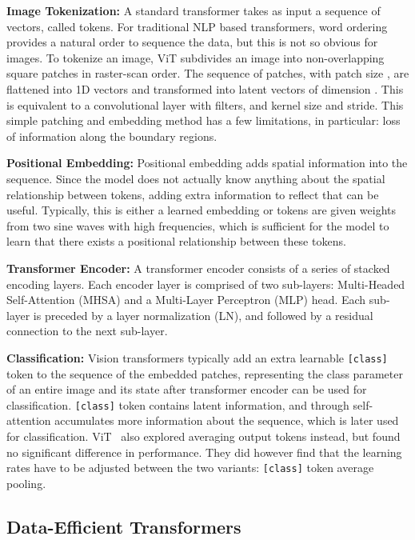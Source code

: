 \documentclass[10pt,twocolumn,letterpaper]{article}
\begin{document}
\textbf{Image Tokenization:}
A standard transformer takes as input a sequence of vectors, called tokens.
For traditional NLP based transformers, word ordering provides a natural order to sequence the data, but this is not so obvious for images.
To tokenize an image, ViT subdivides an image into non-overlapping square patches in raster-scan order.
The sequence of patches,  with patch size , are flattened into 1D vectors and transformed into latent vectors of dimension .
This is equivalent to a convolutional layer with  filters, and  kernel size and stride.
This simple patching and embedding method has a few limitations, in particular: loss of information along the boundary regions.

\textbf{Positional Embedding:}
Positional embedding adds spatial information into the sequence.
Since the model does not actually know anything about the spatial relationship between tokens, adding extra information to reflect that can be useful.
Typically, this is either a learned embedding or tokens are given weights from two sine waves with high frequencies, which is sufficient for the model to learn that there exists a positional relationship between these tokens.


\textbf{Transformer Encoder:}
A transformer encoder consists of a series of stacked encoding layers. Each encoder layer is comprised of two sub-layers: Multi-Headed Self-Attention (MHSA) and a Multi-Layer Perceptron (MLP) head. Each sub-layer is preceded by a layer normalization (LN), and followed by a residual connection to the next sub-layer.

\textbf{Classification:}
Vision transformers typically add an extra learnable \verb|[class]| token to the sequence of the embedded patches, representing the class parameter of an entire image and its state after transformer encoder can be used for classification.
\verb|[class]| token contains latent information, and through self-attention accumulates more information about the sequence, which is later used for classification. ViT~\cite{dosovitskiy2020image} also explored averaging output tokens instead, but found no significant difference in performance. They did however find that the learning rates have to be adjusted between the two variants: \verb|[class]| token \vs average pooling.

\subsection{Data-Efficient Transformers}
\end{document}
